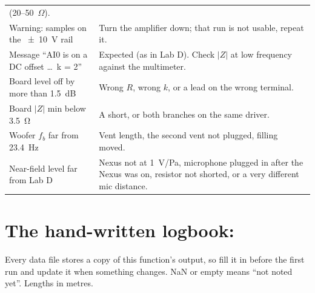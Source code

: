 \documentclass[a4paper,10pt]{article}
\newcommand{\file}[1]{\texttt{\detokenize{#1}}}
\begin{document}
{\begin{longtable}{@{}p{}p{}@{}}
  (20--50~$\Omega$). \\
Warning: samples on the \SI{\pm10}{V} rail & Turn the amplifier down; that run is not usable, repeat it. \\
Message ``AI0 is on a DC offset \ldots\ k = 2'' & Expected (as in Lab D). Check $|Z|$ at low frequency
  against the multimeter. \\
Board level off by more than \SI{1.5}{dB} & Wrong $R$, wrong $k$, or a lead on the wrong terminal. \\
Board $|Z|$ min below \SI{3.5}{\ohm} & A short, or both branches on the same driver. \\
Woofer $f_b$ far from \SI{23.4}{Hz} & Vent length, the second vent not plugged, filling moved. \\
Near-field level far from Lab D & Nexus not at \SI{1}{V/Pa}, microphone plugged in after the Nexus was on,
  resistor not shorted, or a very different mic distance. \\
\bottomrule
\end{longtable}
}

\section{The hand-written logbook: \file{project_dims.m}}\label{app:dims}
Every data file stores a copy of this function's output, so fill it in before the first run and update it
when something changes. NaN or empty means ``not noted yet''. Lengths in metres.
\end{document}
